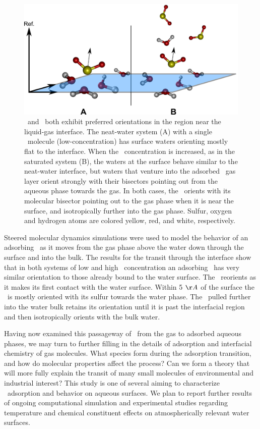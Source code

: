 \begin{figure}[h!]
	\begin{center}
		\includegraphics[scale=1.0]{images/angle-cartoons/system-surface.png}
		\caption{\wat~and \suldiox~both exhibit preferred orientations in the region near the liquid-gas interface. The neat-water system (A) with a single \suldiox~molecule (low-concentration) has surface waters orienting mostly flat to the interface. When the \suldiox~concentration is increased, as in the saturated system (B), the waters at the surface behave similar to the neat-water interface, but waters that venture into the adsorbed \suldiox~gas layer orient strongly with their bisectors pointing out from the aqueous phase towards the gas. In both cases, the \suldiox~orients with its molecular bisector pointing out to the gas phase when it is near the surface, and isotropically further into the gas phase. Sulfur, oxygen and hydrogen atoms are colored yellow, red, and white, respectively.}
		\label{fig:so2-surface-cartoon}
	\end{center}
\end{figure}

Steered molecular dynamics simulations were used to model the behavior of an adsorbing \suldiox~as it moves from the gas phase above the water down through the surface and into the bulk. The results for the transit through the interface show that in both systems of low and high \suldiox~concentration an adsorbing \suldiox~has very similar orientation to those already bound to the water surface. The \suldiox~reorients as it makes its first contact with the water surface. Within 5 $\AA$ of the surface the \suldiox~is mostly oriented with its sulfur towards the water phase. The \suldiox~pulled further into the water bulk retains its orientation until it is past the interfacial region and then isotropically orients with the bulk water.

Having now examined this passageway of \suldiox~from the gas to adsorbed aqueous phases, we may turn to further filling in the details of adsorption and interfacial chemistry of gas molecules. What species form during the adsorption transition, and how do molecular properties affect the process? Can we form a theory that will more fully explain the transit of many small molecules of environmental and industrial interest? This study is one of several aiming to characterize \suldiox~adsorption and behavior on aqueous surfaces. We plan to report further results of ongoing computational simulation and experimental studies regarding temperature and chemical constituent effects on atmospherically relevant water surfaces.
